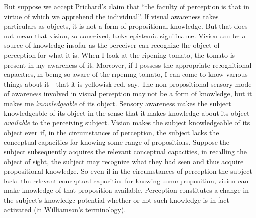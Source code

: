 \documentclass[12pt]{article}
\begin{document}

But suppose we accept Prichard's claim that ``the faculty of perception is that in virtue of which we apprehend the individual''. If visual awareness takes particulars as objects, it is not a form of propositional knowledge. But that does not mean that vision, so conceived, lacks epistemic significance. Vision can be a source of knowledge insofar as the perceiver can recognize the object of perception for what it is. When I look at the ripening tomato, the tomato is present in my awareness of it. Moreover, if I possess the appropriate recognitional capacities, in being so aware of the ripening tomato, I can come to know various things about it---that it is yellowish red, say. The non-propositional sensory mode of awareness involved in visual perception may not be a form of knowledge, but it makes me \emph{knowledgeable} of its object. Sensory awareness makes the subject knowledgeable of its object in the sense that it makes knowledge about its object \emph{available} to the perceiving subject. Vision makes the subject knowledgeable of its object even if, in the circumstances of perception, the subject lacks the conceptual capacities for knowing some range of propositions. Suppose the subject subsequently acquires the relevant conceptual capacities, in recalling the object of sight, the subject may recognize what they had seen and thus acquire propositional knowledge. So even if in the circumstances of perception the subject lacks the relevant conceptual capacities for knowing some proposition, vision can make knowledge of that proposition available. Perception constitutes a change in the subject's knowledge potential whether or not such knowledge is in fact activated (in Williamson's \citeyear{Williamson:1990uq} terminology).
\end{document}
